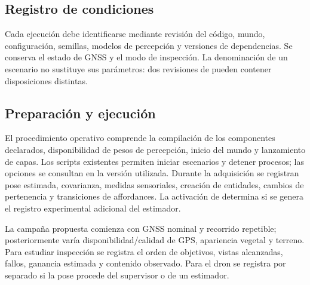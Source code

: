 \subsection{Registro de condiciones}
Cada ejecución debe identificarse mediante revisión del código, mundo, configuración, semillas, modelos de percepción y versiones de dependencias. Se conserva el estado de GNSS y el modo de inspección. La denominación de un escenario no sustituye sus parámetros: dos revisiones de  pueden contener disposiciones distintas.

\subsection{Preparación y ejecución}
El procedimiento operativo comprende la compilación de los componentes declarados, disponibilidad de pesos de percepción, inicio del mundo y lanzamiento de capas. Los scripts existentes permiten iniciar escenarios y detener procesos; las opciones se consultan en la versión utilizada. Durante la adquisición se registran pose estimada, covarianza, medidas sensoriales, creación de entidades, cambios de pertenencia y transiciones de affordances. La activación de  determina si se genera el registro experimental adicional del estimador.

La campaña propuesta comienza con GNSS nominal y recorrido repetible; posteriormente varía disponibilidad/calidad de GPS, apariencia vegetal y terreno. Para estudiar inspección se registra el orden de objetivos, vistas alcanzadas, fallos, ganancia estimada y contenido observado. Para el dron se registra por separado si la pose procede del supervisor o de un estimador.

